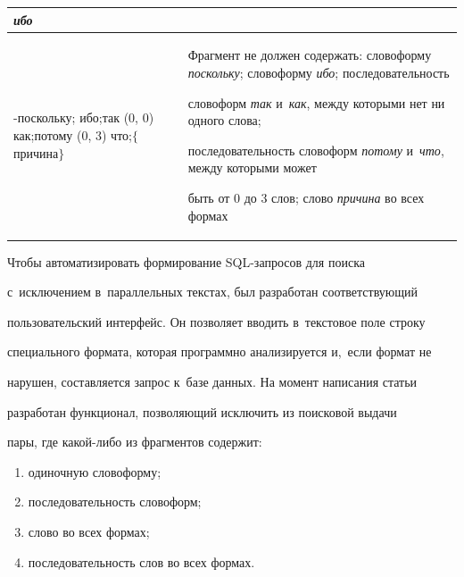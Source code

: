 \begin{table}[b]
\begin{center}
\begin{tabular}{|l|p{87mm}|}
\textit{ибо}\\


\hline


\multicolumn{1}{|p{35mm}|}{%


-поскольку; ибо;\newline \hphantom{-}так (0, 0) как;\newline \hphantom{-}потому (0, 3) что;\newline \hphantom{-}$\{$причина$\}$}%


&


Фрагмент не должен  содержать: словоформу \textit{поскольку}; словоформу \textit{ибо}; последовательность 


словоформ \textit{так} и~\textit{как}, между которыми нет ни одного слова; 


последовательность словоформ \textit{потому} и~\textit{что}, между которыми может 


быть от 0 до 3 слов; слово \textit{причина} во всех формах\\


\hline


\end{tabular}


\end{center}


\vspace*{-12pt}


\end{table}








Чтобы автоматизировать формирование SQL-за\-про\-сов для поиска 


с~исключением в~параллельных текс\-тах, был разработан со\-от\-вет\-ст\-ву\-ющий 


пользовательский интерфейс. Он позволяет вводить в~текстовое поле строку 


специального формата, которая программно анализируется и,~если формат не 


нарушен, со\-став\-ля\-ет\-ся запрос к~базе данных. На момент написания статьи 


разработан функционал, поз\-во\-ля\-ющий исключить из поисковой выдачи 


пары, где ка\-кой-ли\-бо из фрагментов содержит:


\begin{enumerate}[(1)]


\item одиночную словоформу;


\item последовательность словоформ;


\item слово во всех формах;


\item последовательность слов во всех формах.


\end{enumerate}


